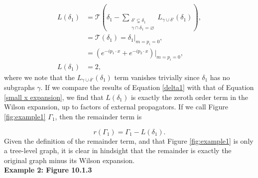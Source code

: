 \documentclass{article}
\begin{document}
\begin{equation}
\begin{split}
    L(\delta_1) &= \mathcal{T}\left( \delta_1 - \sum_{\substack{\delta'\varsubsetneq \delta_1 \\ \gamma\cap\delta_1 = \varnothing }} L_{\gamma\cup\delta'}(\delta_1)  \right),\\
    &= \mathcal{T}(\delta_1) = \delta_1\vert_{m=p_i=0},\\
    &= (e^{-ip_1\cdot x} + e^{-ip_2\cdot x})\vert_{m=p_i=0},\\
    L(\delta_1) &=2,
\end{split}
\label{delta1}
\end{equation}
where we note that the $L_{\gamma\cup\delta'}(\delta_1)$ term vanishes trivially since $\delta_1$ has no subgraphs $\gamma$.  If we compare the results of Equation \ref{delta1} with that of Equation \ref{small x expansion}, we find that $L(\delta_1)$ is exactly the zeroth order term in the Wilson expansion, up to factors of external propagators. If we call Figure \ref{fig:example1} $\Gamma_1$, then the remainder term is 

\begin{equation}
    r(\Gamma_1) = \Gamma_1 - L(\delta_1).
\end{equation}
Given the definition of the remainder term, and that Figure \ref{fig:example1} is only a tree-level graph, it is clear in hindsight that the remainder is exactly the original graph minus its Wilson expansion.\\

\noindent\textbf{Example 2: Figure 10.1.3}
\end{document}
